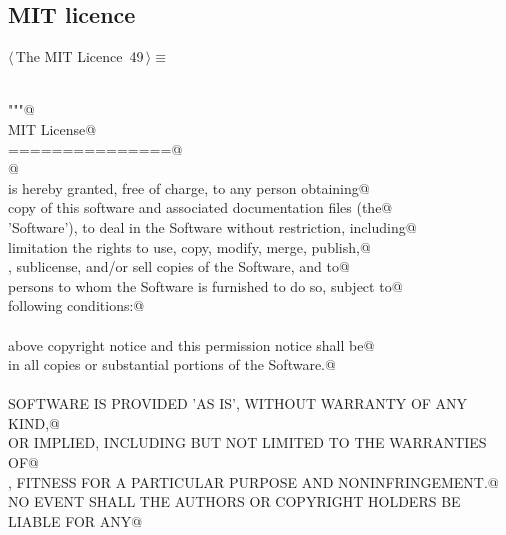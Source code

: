 \documentclass[11pt,oneside]{article}	%
\begin{document}
\subsection{MIT licence}
\begin{flushleft} \small \label{scrap80}
\protect{}$\langle\,$The MIT Licence\nobreak\ {\footnotesize 49}$\,\rangle\equiv$
\vspace{-1ex}
\begin{list}{}{} \item
\mbox{}\verb@@\\
\mbox{}\verb@"""@\\
\mbox{}\verb@The MIT License@\\
\mbox{}\verb@===============@\\
\mbox{}\verb@   @\\
\mbox{}\verb@Permission is hereby granted, free of charge, to any person obtaining@\\
\mbox{}\verb@a copy of this software and associated documentation files (the@\\
\mbox{}\verb@'Software'), to deal in the Software without restriction, including@\\
\mbox{}\verb@without limitation the rights to use, copy, modify, merge, publish,@\\
\mbox{}\verb@distribute, sublicense, and/or sell copies of the Software, and to@\\
\mbox{}\verb@permit persons to whom the Software is furnished to do so, subject to@\\
\mbox{}\verb@the following conditions:@\\
\mbox{}\verb@@\\
\mbox{}\verb@The above copyright notice and this permission notice shall be@\\
\mbox{}\verb@included in all copies or substantial portions of the Software.@\\
\mbox{}\verb@@\\
\mbox{}\verb@THE SOFTWARE IS PROVIDED 'AS IS', WITHOUT WARRANTY OF ANY KIND,@\\
\mbox{}\verb@EXPRESS OR IMPLIED, INCLUDING BUT NOT LIMITED TO THE WARRANTIES OF@\\
\mbox{}\verb@MERCHANTABILITY, FITNESS FOR A PARTICULAR PURPOSE AND NONINFRINGEMENT.@\\
\mbox{}\verb@IN NO EVENT SHALL THE AUTHORS OR COPYRIGHT HOLDERS BE LIABLE FOR ANY@\\

\end{list}
\end{flushleft}
\end{document}
